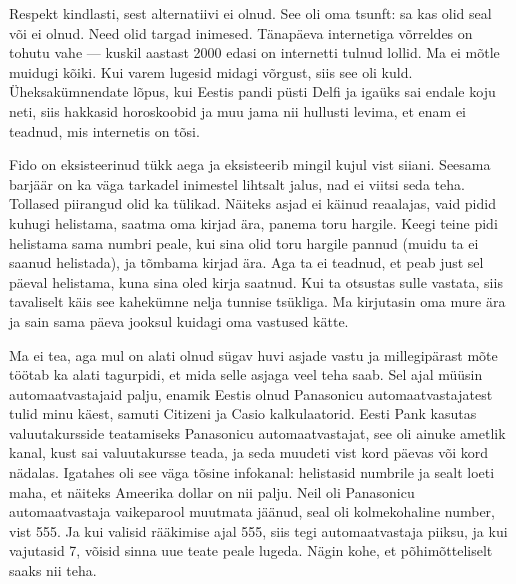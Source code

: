 Respekt kindlasti, sest alternatiivi ei olnud. See oli oma tsunft: sa kas 
olid seal või ei olnud. Need olid targad inimesed. Tänapäeva internetiga võrreldes on 
tohutu vahe --- kuskil aastast 2000 edasi on internetti tulnud lollid. Ma ei 
mõtle muidugi kõiki. Kui varem lugesid midagi võrgust, siis see oli 
kuld. Üheksakümnendate lõpus, kui Eestis pandi 
püsti Delfi ja igaüks sai endale koju
neti, siis hakkasid horoskoobid ja muu jama nii hullusti 
levima, et enam ei teadnud, mis internetis on tõsi. 


Fido on eksisteerinud tükk aega ja eksisteerib mingil kujul vist siiani. 
Seesama barjäär on ka väga tarkadel inimestel lihtsalt jalus, nad ei viitsi 
seda teha. Tollased piirangud olid ka tülikad. Näiteks asjad ei 
käinud reaalajas, vaid pidid kuhugi helistama, saatma oma kirjad ära, panema toru 
hargile. Keegi teine pidi helistama sama numbri peale, kui sina olid toru 
hargile pannud (muidu ta ei saanud helistada), ja tõmbama kirjad ära. Aga ta ei 
teadnud, et peab just sel päeval helistama, kuna sina oled kirja saatnud. Kui ta otsustas 
sulle vastata, siis tavaliselt käis see kahekümne nelja tunnise 
tsükliga. Ma kirjutasin oma mure ära ja sain sama päeva jooksul kuidagi oma 
vastused kätte. 


Ma ei tea, aga mul on 
alati olnud sügav huvi asjade vastu ja millegipärast mõte töötab ka alati 
tagurpidi, et mida selle asjaga veel teha saab. Sel ajal müüsin automaatvastajaid palju, 
enamik Eestis olnud Panasonicu automaatvastajatest tulid minu käest, 
samuti Citizeni ja Casio kalkulaatorid. Eesti 
Pank kasutas valuutakursside teatamiseks Panasonicu 
automaatvastajat, see oli ainuke ametlik kanal, kust sai valuutakursse teada, 
ja seda muudeti vist kord päevas või kord nädalas. Igatahes oli 
see väga tõsine infokanal: helistasid numbrile ja sealt loeti maha, 
et näiteks Ameerika dollar on nii palju. Neil 
oli Panasonicu automaatvastaja vaikeparool muutmata jäänud, seal oli 
kolmekohaline number, vist 555. Ja kui 
valisid rääkimise ajal 555, siis tegi automaatvastaja piiksu, ja kui vajutasid 7, võisid sinna uue teate peale lugeda. Nägin kohe, 
et põhimõtteliselt saaks nii teha. 



